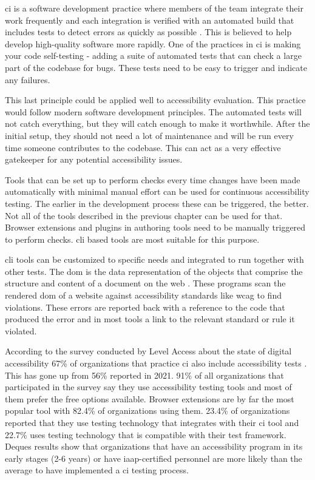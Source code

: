\documentclass{master_thesis}
\begin{document}
\Ac{ci} is a software development practice where members of the team integrate their work frequently and each integration is verified with an automated build that includes tests to detect errors as quickly as possible \citep{Fowler2006}. This is believed to help develop high-quality software more rapidly. One of the practices in \ac{ci} is making your code self-testing - adding a suite of automated tests that can check a large part of the codebase for bugs. These tests need to be easy to trigger and indicate any failures.

This last principle could be applied well to accessibility evaluation. This practice would follow modern software development principles. The automated tests will not catch everything, but they will catch enough to make it worthwhile. After the initial setup, they should not need a lot of maintenance and will be run every time someone contributes to the codebase. This can act as a very effective gatekeeper for any potential accessibility issues.

Tools that can be set up to perform checks every time changes have been made automatically with minimal manual effort can be used for continuous accessibility testing. The earlier in the development process these can be triggered, the better. Not all of the tools described in the previous chapter can be used for that. Browser extensions and plugins in authoring tools need to be manually triggered to perform checks. \ac{cli} based tools are most suitable for this purpose.

\ac{cli} tools can be customized to specific needs and integrated to run together with other tests. The \ac{dom} is the data representation of the objects that comprise the structure and content of a document on the web \citep{MDN2023}. These programs scan the rendered \ac{dom} of a website against accessibility standards like \ac{wcag} to find violations. These errors are reported back with a reference to the code that produced the error and in most tools a link to the relevant standard or rule it violated.

According to the survey conducted by Level Access about the state of digital accessibility 67\% of organizations that practice \ac{ci} also include accessibility tests \citep{LevelAccess}. This has gone up from 56\% reported in 2021. 91\% of all organizations that participated in the survey say they use accessibility testing tools and most of them prefer the free options available. Browser extensions are by far the most popular tool with 82.4\% of organizations using them. 23.4\% of organizations reported that they use testing technology that integrates with their \ac{ci} tool and 22.7\% uses testing technology that is compatible with their test framework. Deques results show that organizations that have an accessibility program in its early stages (2-6 years) or have \ac{iaap}-certified personnel are more likely than the average to have implemented a \ac{ci} testing process.
\end{document}
